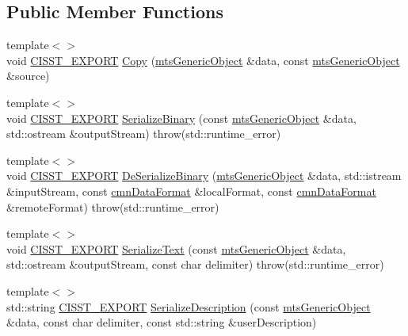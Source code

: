 \subsection*{Public Member Functions}
\begin{DoxyCompactItemize}
\item 
{\footnotesize template$<$$>$ }\\void \hyperlink{cmn_export_macros_8h_a99393e0c3ac434b2605235bbe20684f8}{C\+I\+S\+S\+T\+\_\+\+E\+X\+P\+O\+R\+T} \hyperlink{classcmn_data_a2804cf73512f6dd28850d02814f4d0ed}{Copy} (\hyperlink{classmts_generic_object}{mts\+Generic\+Object} \&data, const \hyperlink{classmts_generic_object}{mts\+Generic\+Object} \&source)
\item 
{\footnotesize template$<$$>$ }\\void \hyperlink{cmn_export_macros_8h_a99393e0c3ac434b2605235bbe20684f8}{C\+I\+S\+S\+T\+\_\+\+E\+X\+P\+O\+R\+T} \hyperlink{classcmn_data_ad1f23b9d64e2839d0a63592ee85aed32}{Serialize\+Binary} (const \hyperlink{classmts_generic_object}{mts\+Generic\+Object} \&data, std\+::ostream \&output\+Stream) throw(std\+::runtime\+\_\+error)
\item 
{\footnotesize template$<$$>$ }\\void \hyperlink{cmn_export_macros_8h_a99393e0c3ac434b2605235bbe20684f8}{C\+I\+S\+S\+T\+\_\+\+E\+X\+P\+O\+R\+T} \hyperlink{classcmn_data_af379001696641cad5bca9db8cdf2f03d}{De\+Serialize\+Binary} (\hyperlink{classmts_generic_object}{mts\+Generic\+Object} \&data, std\+::istream \&input\+Stream, const \hyperlink{classcmn_data_format}{cmn\+Data\+Format} \&local\+Format, const \hyperlink{classcmn_data_format}{cmn\+Data\+Format} \&remote\+Format) throw(std\+::runtime\+\_\+error)
\item 
{\footnotesize template$<$$>$ }\\void \hyperlink{cmn_export_macros_8h_a99393e0c3ac434b2605235bbe20684f8}{C\+I\+S\+S\+T\+\_\+\+E\+X\+P\+O\+R\+T} \hyperlink{classcmn_data_aa5321f255db70402c20ca05f1733f27d}{Serialize\+Text} (const \hyperlink{classmts_generic_object}{mts\+Generic\+Object} \&data, std\+::ostream \&output\+Stream, const char delimiter) throw(std\+::runtime\+\_\+error)
\item 
{\footnotesize template$<$$>$ }\\std\+::string \hyperlink{cmn_export_macros_8h_a99393e0c3ac434b2605235bbe20684f8}{C\+I\+S\+S\+T\+\_\+\+E\+X\+P\+O\+R\+T} \hyperlink{classcmn_data_a1c2961c2308789171187d31bc3e97171}{Serialize\+Description} (const \hyperlink{classmts_generic_object}{mts\+Generic\+Object} \&data, const char delimiter, const std\+::string \&user\+Description)

\end{DoxyCompactItemize}
